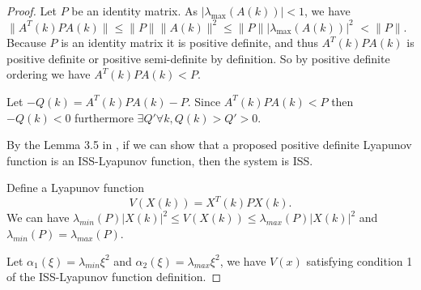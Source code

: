 \documentclass{sig-alternate}
\begin{document}
\begin{proof} 
Let $ P $ be an identity matrix.
As $ | \lambda_{\max} ( A(k) ) | < 1 $, we have
$
\lVert A^{T}(k) P A(k) \rVert \leq \lVert P \rVert \lVert A(k) \rVert^{2} \leq \lVert P \rVert | \lambda_{\max} ( A(k) ) |^{2} $ $  <  \lVert P \rVert .
$
Because $ P $ is an identity matrix it is positive definite, and thus $ A^{T}(k) P A(k) $ is positive definite or positive semi-definite by definition.
So by positive definite ordering we have $ A^{T}(k) P A(k) < P $.
		
Let $ -Q(k) = A^{T}(k) P A(k) - P $. Since $ A^{T}(k) P A(k) < P $ then $ - Q(k) < 0 $ furthermore $ \exists Q' \forall k, Q(k) > Q' > 0 $. 
		
By the Lemma 3.5 in \cite{Jiang2001857}, if we can show that a proposed positive definite Lyapunov function is an ISS-Lyapunov function, then the system is ISS.
		
Define a Lyapunov function
\begin{equation}
\label{eq:lyapunov_v}
V( X(k) ) = X^{T} (k) P X(k).
\end{equation}
We can have
$
\lambda_{min}(P) | X(k) |^{2} \leq V( X(k) )\leq \lambda_{max}(P) | X(k) |^{2}
$ and $ \lambda_{min}(P) = \lambda_{max}(P) $.
		
Let $ \alpha_{1} ( \xi )= \lambda_{min} \xi^{2} $
and 
$ \alpha_{2} ( \xi )= \lambda_{max} \xi^{2} $,
we have $ V(x) $ satisfying condition 1 of the ISS-Lyapunov function definition.
		

\end{proof}
\end{document}
